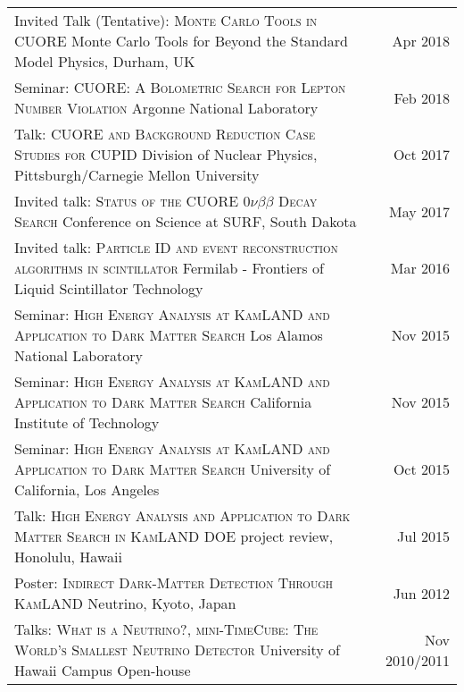 \documentclass[10pt]{article} %
\begin{document}
\noindent\begin{tabularx}{\linewidth}{@{{}\textbullet\enskip}X@{\quad}r@{}}
\addlinespace[5pt]
Invited Talk (Tentative): \textsc{Monte Carlo Tools in CUORE} \newline Monte Carlo Tools for Beyond the Standard Model Physics, Durham, UK & Apr 2018 \\
\addlinespace[5pt]
Seminar: \textsc{CUORE: A Bolometric Search for Lepton Number Violation} \newline Argonne National Laboratory & Feb 2018 \\
\addlinespace[5pt]
Talk: \textsc{CUORE and Background Reduction Case Studies for CUPID} \newline Division of Nuclear Physics, Pittsburgh/Carnegie Mellon University & Oct 2017 \\
\addlinespace[5pt]
Invited talk: \textsc{Status of the CUORE $0\nu\beta\beta$ Decay Search} \newline Conference on Science at SURF, South Dakota & May 2017 \\
\addlinespace[5pt]
Invited talk: \textsc{Particle ID and event reconstruction algorithms in scintillator} \newline Fermilab - Frontiers of Liquid Scintillator Technology & Mar 2016 \\
\addlinespace[5pt]
Seminar: \textsc{High Energy Analysis at KamLAND and Application to Dark Matter Search} \newline Los Alamos National Laboratory & Nov 2015 \\
\addlinespace[5pt]
Seminar: \textsc{High Energy Analysis at KamLAND and Application to Dark Matter Search} \newline California Institute of Technology & Nov 2015 \\
\addlinespace[5pt]
Seminar: \textsc{High Energy Analysis at KamLAND and Application to Dark Matter Search} \newline University of California, Los Angeles & Oct 2015 \\
\addlinespace[5pt]
Talk: \textsc{High Energy Analysis and Application to Dark Matter Search in KamLAND} \newline DOE project review, Honolulu, Hawaii & Jul 2015 \\
\addlinespace[5pt]
Poster: \textsc{Indirect Dark-Matter Detection Through KamLAND} \newline Neutrino, Kyoto, Japan & Jun 2012 \\
\addlinespace[5pt]
Talks: \textsc{What is a Neutrino?}, \textsc{mini-TimeCube: The World's Smallest Neutrino Detector} \newline University of Hawaii Campus Open-house & Nov 2010/2011 \\

\end{tabularx}
\end{document}

